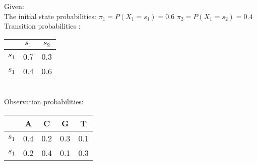\documentclass[a4paper,doc,notimes]{article}
\begin{document}
Given: \\
The initial state probabilities: \indent $\pi_1 = P(X_1=s_1) = 0.6$   \indent $\pi_2 = P(X_1=s_2) = 0.4$ \\
Transition probabilities : \indent  
\begin{tabular}{|c|c|c|} \hline
	          & $s_1$ & $s_2$ \\ \hline
	$s_1$ & 0.7 & 0.3 \\
	$s_1$ & 0.4 & 0.6 \\ \hline
\end{tabular} \\
Observation probabilities: 
\begin{tabular}{|c|c|c|c|c|} \hline
	         &   A   & C   & G & T \\ \hline
	$s_1$ & 0.4 & 0.2 & 0.3 & 0.1 \\
	$s_1$ & 0.2 & 0.4 & 0.1 & 0.3 \\ \hline
\end{tabular} \\
\end{document}
